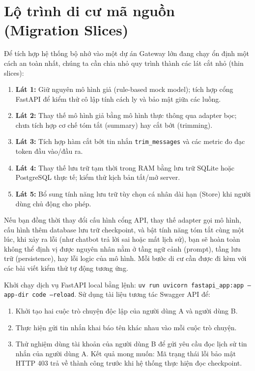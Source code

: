 \section{Lộ trình di cư mã nguồn (Migration Slices)}

Để tích hợp hệ thống bộ nhớ vào một dự án Gateway lớn đang chạy ổn định một cách an toàn nhất, chúng ta cần chia nhỏ quy trình thành các lát cắt nhỏ (thin slices):

\begin{enumerate}
  \item \textbf{Lát 1:} Giữ nguyên mô hình giả (rule-based mock model); tích hợp cổng FastAPI để kiểm thử cô lập tính cách ly và bảo mật giữa các luồng.
  \item \textbf{Lát 2:} Thay thế mô hình giả bằng mô hình thực thông qua adapter bọc; chưa tích hợp cơ chế tóm tắt (summary) hay cắt bớt (trimming).
  \item \textbf{Lát 3:} Tích hợp hàm cắt bớt tin nhắn \texttt{trim\_messages} và các metric đo đạc token đầu vào/đầu ra.
  \item \textbf{Lát 4:} Thay thế lưu trữ tạm thời trong RAM bằng lưu trữ SQLite hoặc PostgreSQL thực tế; kiểm thử kịch bản tắt/mở server.
  \item \textbf{Lát 5:} Bổ sung tính năng lưu trữ tùy chọn cá nhân dài hạn (Store) khi người dùng chủ động cho phép.
\end{enumerate}

\begin{aiwarning}
Nếu bạn đồng thời thay đổi cấu hình cổng API, thay thế adapter gọi mô hình, cấu hình thêm database lưu trữ checkpoint, và bật tính năng tóm tắt cùng một lúc, khi xảy ra lỗi (như chatbot trả lời sai hoặc mất lịch sử), bạn sẽ hoàn toàn không thể định vị được nguyên nhân nằm ở tầng ngữ cảnh (prompt), tầng lưu trữ (persistence), hay lỗi logic của mô hình. Mỗi bước di cư cần được đi kèm với các bài viết kiểm thử tự động tương ứng.
\end{aiwarning}

\begin{aicheckpoint}
Khởi chạy dịch vụ FastAPI local bằng lệnh: \texttt{uv run uvicorn fastapi\_app:app --app-dir code --reload}. Sử dụng tài liệu tương tác Swagger API để:
\begin{enumerate}
  \item Khởi tạo hai cuộc trò chuyện độc lập của người dùng A và người dùng B.
  \item Thực hiện gửi tin nhắn khai báo tên khác nhau vào mỗi cuộc trò chuyện.
  \item Thử nghiệm dùng tài khoản của người dùng B để gửi yêu cầu đọc lịch sử tin nhắn của người dùng A. Kết quả mong muốn: Mã trạng thái lỗi bảo mật HTTP 403 trả về thành công trước khi hệ thống thực hiện đọc checkpoint.
\end{enumerate}
\end{aicheckpoint}
